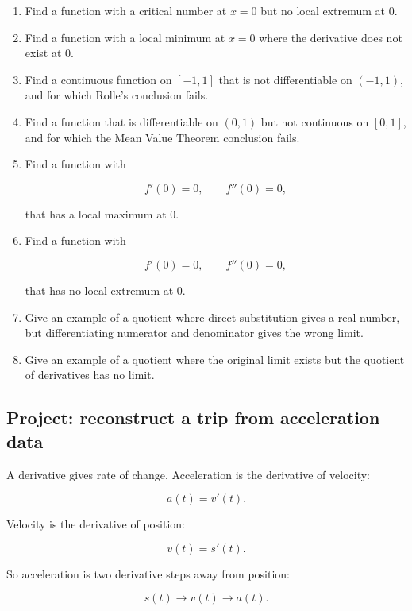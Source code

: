 \begin{enumerate}
\item Find a function with a critical number at \(x=0\) but no local extremum at \(0\).

\item Find a function with a local minimum at \(x=0\) where the derivative does not
exist at \(0\).

\item Find a continuous function on \([-1,1]\) that is not differentiable on \((-1,1)\),
and for which Rolle's conclusion fails.

\item Find a function that is differentiable on \((0,1)\) but not continuous on \([0,1]\),
and for which the Mean Value Theorem conclusion fails.

\item Find a function with

\[
f'(0)=0,
\qquad
f''(0)=0,
\]

that has a local maximum at \(0\).

\item Find a function with

\[
f'(0)=0,
\qquad
f''(0)=0,
\]

that has no local extremum at \(0\).

\item Give an example of a quotient where direct substitution gives a real number, but
differentiating numerator and denominator gives the wrong limit.

\item Give an example of a quotient where the original limit exists but the quotient of
derivatives has no limit.
\end{enumerate}

\subsection{Project: reconstruct a trip from acceleration data}
\label{subsec:project-reconstruct-trip-acceleration}

A derivative gives rate of change.  Acceleration is the derivative of velocity:

\[
a(t)=v'(t).
\]

Velocity is the derivative of position:

\[
v(t)=s'(t).
\]

So acceleration is two derivative steps away from position:

\[
s(t)
\longrightarrow
v(t)
\longrightarrow
a(t).
\]

